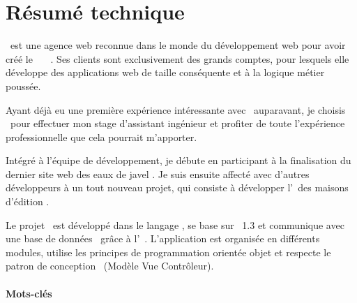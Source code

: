\section*{Résumé technique}

\asl\ est une agence web reconnue dans le monde du développement web pour avoir créé le \afm\ \aphp\ \aos\ \asf. Ses clients sont exclusivement des grands comptes, pour lesquels elle développe des applications web de taille conséquente et à la logique métier poussée.

Ayant déjà eu une première expérience intéressante avec \asf\ auparavant, je choisis \asl\ pour effectuer mon stage d'assistant ingénieur et profiter de toute l'expérience professionnelle que cela pourrait m'apporter.

Intégré à l'équipe de développement, je débute en participant à la finalisation du dernier site web des eaux de javel \alc. Je suis ensuite affecté avec d'autres développeurs à un tout nouveau projet, qui consiste à développer l'\aintranet\ des maisons d'édition \aey.

Le projet \aey\ est développé dans le langage \aphp, se base sur \asf~1.3 et communique avec une base de données \apsql\ grâce à l'\aorm\ \adoctrine. L'application est organisée en différents modules, utilise les principes de programmation orientée objet et respecte le patron de conception \amvc\ (Modèle Vue Contrôleur).

\paragraph{Mots-clés}

\customkeywords
